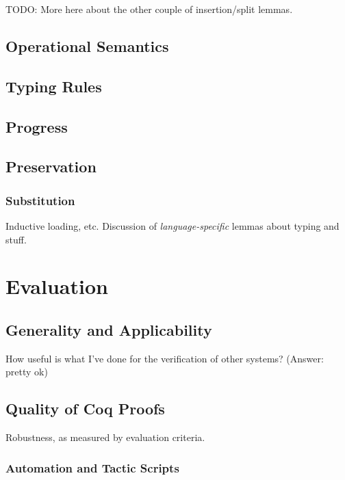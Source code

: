 \documentclass[]{unswthesis}
\let\i\textit
\begin{document}
TODO: More here about the other couple of insertion/split lemmas.


\section{Operational Semantics}

\section{Typing Rules}

\section{Progress}

\section{Preservation}

\subsection{Substitution}

Inductive loading, etc. Discussion of \i{language-specific} lemmas about typing and stuff.

\chapter{Evaluation}

\section{Generality and Applicability}

How useful is what I've done for the verification of other systems? (Answer: pretty ok)

\section{Quality of Coq Proofs}

Robustness, as measured by evaluation criteria.

\subsection{Automation and Tactic Scripts}
\end{document}
